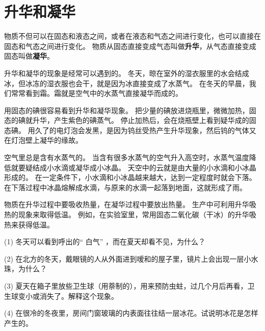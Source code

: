 \section{升华和凝华}\label{sec:4-5}

物质不但可以在固态和液态之间，或者在液态和气态之间进行变化，也可以直接在固态和气态之间进行变化。
物质从固态直接变成气态叫做\textbf{升华}，从气态直接变成固态叫做\textbf{凝华}。

升华和凝华的现象是经常可以遇到的。
冬天，晾在室外的湿衣服里的水会结成冰，但冰冻的湿衣服也会干，就是因为冰直接变成了水蒸气。
在冬天的早晨，我们常常看到霜。霜就是空气中的水蒸气直接凝华而成的。

用固态的碘很容易看到升华和凝华现象。
把少量的碘放进烧瓶里，微微加热，固态的碘就升华，产生紫色的碘蒸气。
停止加热后，会在烧瓶壁上看到疑华成的固态碘。
用久了的电灯泡会发黑，是因为钨丝受热产生升华现象，然后钨的气体又在灯泡壁上凝华的缘故。

空气里总是含有水蒸气的。
当含有很多水蒸气的空气升入高空时，水蒸气温度降低就要疑结成小水滴或凝华成小冰晶。
天空中的云就是由大量的小水滴和小冰晶形成的。
在一定条件下，小水滴和小冰晶越来越大，达到一定程度时就会下落。
在下落过程中冰晶熔解成水滴，与原来的水滴一起落到地面，这就形成了雨。

物质在升华过程中要吸收热量，在凝华过程中要放出热量。
生产中可利用升华吸热的现象来取得低温。
例如，在实验室里，常用固态二氧化碳（干冰）的升华吸热来获得低温。



\lianxi

(1) 冬天可以看到呼出的“ 白气” ，而在夏天却看不见，为什么？

(2) 在北方的冬天，戴眼镜的人从外面进到嗳和的屋子里，镜片上会出现一层小水珠，为什么？

(3) 夏天在箱子里放些卫生球（用萘制的），用来预防虫蛀，过几个月后再看，卫生球变小或消失了。解释这个现象。

(4) 在很冷的冬夜里，房间门窗玻璃的内表面往往结一层冰花。试说明冰花是怎样产生的。


